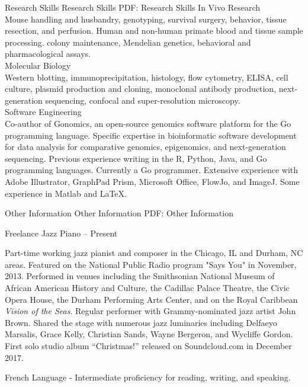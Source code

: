 \documentclass[letterpaper,MMMyyyy,nonstopmode]{simpleresumecv}
\begin{document}
\begin{Body}
\Section
{Research Skills}
{Research Skills}
{PDF: Research Skills}
\BulletItem
In Vivo Research\\
Mouse handling and husbandry, genotyping, survival surgery, behavior, tissue resection, and perfusion. 
Human and non-human primate blood and tissue sample processing.  colony maintenance, Mendelian genetics, behavioral and pharmacological assays. \\
\BulletItem
Molecular Biology\\
Western blotting, immunoprecipitation, histology, flow cytometry, ELISA, cell culture, plasmid production and cloning, monoclonal antibody production, next-generation sequencing, confocal and super-resolution microscopy.\\
\BulletItem
Software Engineering\\
Co-author of Gonomics, an open-source genomics software platform for the Go programming language. Specific expertise in bioinformatic software development for data analysis for comparative genomics, epigenomics, and next-generation sequencing. Previous experience writing in the R, Python, Java, and Go programming languages. Currently a Go programmer. Extensive experience with Adobe Illustrator, GraphPad Prism, Microsoft Office, FlowJo, and ImageJ. Some experience in Matlab and {\LaTeX}. 



\Section
{Other Information}
{Other Information}
{PDF: Other Information}

\Gap
\BulletItem
Freelance Jazz Piano \hfill{-- Present}
\begin{Detail}
\SubBulletItem
Part-time working jazz pianist and composer in the Chicago, IL and Durham, NC areas. 
\SubBulletItem
Featured on the National Public Radio program "Says You" in November, 2013. 
\SubBulletItem
Performed in venues including the Smithsonian National Museum of African American History and Culture, the Cadillac Palace Theatre, the Civic Opera House, the Durham Performing Arts Center, and on the Royal Caribbean \textit{Vision of the Seas}.
\SubBulletItem
Regular performer with Grammy-nominated jazz artist John Brown. Shared the stage with numerous jazz luminaries including Delfaeyo Marsalis, Grace Kelly, Christian Sands, Wayne Bergeron, and Wycliffe Gordon.
\SubBulletItem
First solo studio album “Christmas!” released on Soundcloud.com in December 2017. 
\end{Detail}
\Gap
\BulletItem
French Language - Intermediate proficiency for reading, writing, and speaking.


\end{Body}
\end{document}
